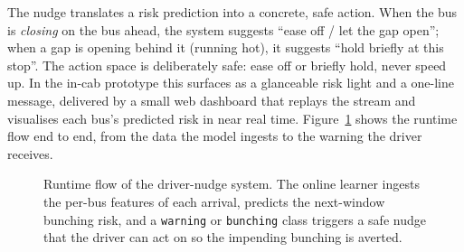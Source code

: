 \documentclass[11pt,a4paper]{article}
\begin{document}
The nudge translates a risk prediction into a concrete, safe action. When the bus is \emph{closing}
on the bus ahead, the system suggests ``ease off / let the gap open''; when a gap is opening behind
it (running hot), it suggests ``hold briefly at this stop''. The action space is deliberately safe:
ease off or briefly hold, never speed up. In the in-cab prototype this surfaces as a glanceable
risk light and a one-line message, delivered by a small web dashboard that replays the stream and
visualises each bus's predicted risk in near real time. Figure~\ref{fig:system} shows the runtime
flow end to end, from the data the model ingests to the warning the driver receives.

\begin{figure}[htbp]
\centering
{}
\caption{Runtime flow of the driver-nudge system. The online learner ingests the per-bus features
of each arrival, predicts the next-window bunching risk, and a \texttt{warning} or
\texttt{bunching} class triggers a safe nudge that the driver can act on so the impending bunching
is averted.}
\label{fig:system}
\end{figure}
\end{document}
